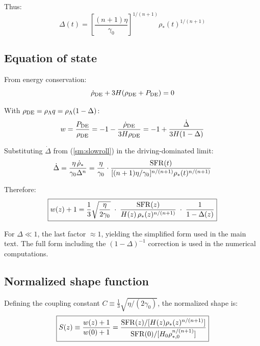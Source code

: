 \documentclass[12pt,a4paper]{article}
\begin{document}
Thus:
\begin{equation}\label{sm:delta}
\boxed{\Delta(t) = \left[\frac{(n+1)\eta}{\gamma_0}\right]^{1/(n+1)} \rho_*(t)^{1/(n+1)}}
\end{equation}

\subsection{Equation of state}

From energy conservation:
\begin{equation}
\dot{\rho}_{\rm DE} + 3H(\rho_{\rm DE}+P_{\rm DE}) = 0
\end{equation}

With $\rho_{\rm DE}=\rho_\Lambda q = \rho_\Lambda(1-\Delta)$:
\begin{equation}
w = \frac{P_{\rm DE}}{\rho_{\rm DE}} = -1 - \frac{\dot{\rho}_{\rm DE}}{3H\rho_{\rm DE}} = -1 + \frac{\dot{\Delta}}{3H(1-\Delta)}
\end{equation}

Substituting $\dot{\Delta}$ from (\ref{sm:slowroll}) in the driving-dominated limit:
\begin{equation}
\dot{\Delta} = \frac{\eta\,\dot{\rho}_*}{\gamma_0\Delta^n} = \frac{\eta}{\gamma_0}\cdot\frac{{\rm SFR}(t)}{[(n+1)\eta/\gamma_0]^{n/(n+1)}\rho_*(t)^{n/(n+1)}}
\end{equation}

Therefore:
\begin{equation}\label{sm:wfinal}
\boxed{w(z)+1 = \frac{1}{3}\sqrt{\frac{\eta}{2\gamma_0}}\;\cdot\;\frac{{\rm SFR}(z)}{H(z)\,\rho_*(z)^{n/(n+1)}}\;\cdot\;\frac{1}{1-\Delta(z)}}
\end{equation}

For $\Delta\ll1$, the last factor $\approx1$, yielding the simplified form used in the main text. The full form including the $(1-\Delta)^{-1}$ correction is used in the numerical computations.

\subsection{Normalized shape function}

Defining the coupling constant $C\equiv\frac{1}{3}\sqrt{\eta/(2\gamma_0)}$, the normalized shape is:
\begin{equation}
\boxed{S(z)\equiv\frac{w(z)+1}{w(0)+1} = \frac{{\rm SFR}(z)/[H(z)\rho_*(z)^{n/(n+1)}]}{{\rm SFR}(0)/[H_0\rho_{*,0}^{n/(n+1)}]}}
\end{equation}
\end{document}

